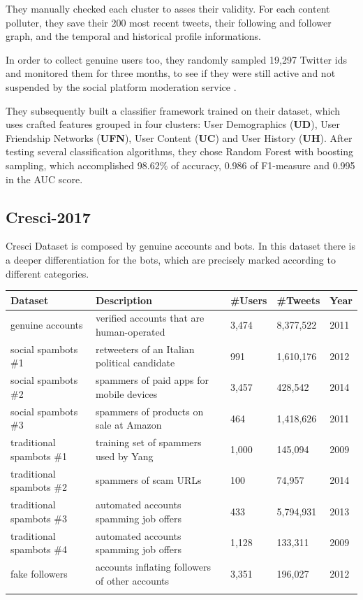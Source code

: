 They manually checked each cluster to asses their validity.
For each content polluter, they save their 200 most recent tweets, their following and follower graph, and the temporal and historical profile informations.

In order to collect genuine users too, they randomly sampled 19,297 Twitter ids and monitored them for three months, to see if they were still active and not suspended by the social platform moderation service \cite{Lee11sevenmonths}.

They subsequently built a classifier framework trained on their dataset, which uses crafted features grouped in four clusters:
User Demographics (\textbf{UD}), User Friendship Networks (\textbf{UFN}), User Content (\textbf{UC}) and User History (\textbf{UH}).
After testing several classification algorithms, they chose Random Forest with boosting sampling, which accomplished 98.62\% of accuracy, 0.986 of F1-measure and 0.995 in the AUC score.

\subsection{Cresci-2017}
Cresci Dataset is composed by genuine accounts and bots. In this dataset there is a deeper differentiation for the bots, which are precisely marked according to different categories.

\tiny
\begin{center}
\begin{tabular}{lllll}
	Dataset&Description&\#Users&\#Tweets&Year\\ \hline\hline
	genuine accounts&
	verified accounts that are human-operated&
	3,474&
	8,377,522
	&2011\\
	social spambots \#1&
	retweeters of an Italian political candidate&
	991&
	1,610,176&
	2012 \\
	social spambots \#2&
	spammers of paid apps for mobile devices&
	3,457&
	428,542&
	2014 \\
	social spambots \#3&
	spammers of products on sale at	Amazon&
	464&
	1,418,626&
	2011 \\
	traditional spambots \#1&
	training set of spammers used by Yang\cite{Yang}&
	1,000&
	145,094&
	2009 \\
	traditional spambots \#2&
	spammers of scam URLs&
	100&
	74,957&
	2014 \\
	traditional spambots \#3&
	automated accounts spamming job offers&
	433&
	5,794,931&
	2013 \\
	traditional spambots \#4&
	automated accounts spamming job offers&
	1,128&
	133,311&
	2009 \\
	fake followers&
	accounts inflating followers of other accounts&
	3,351&
	196,027&
	2012 \\ \hline\\
	
\end{tabular}
\end{center}

